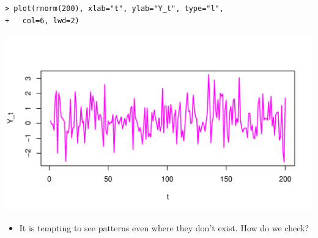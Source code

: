 \documentclass[12pt,xcolor=svgnames]{beamer}
\newcommand{\bl}{\color{blue}}
\newcommand{\nochap}{\vspace{0.5cm}}
\newcommand{\nsk}{\vspace{-.4cm}}
\begin{document}
\begin{frame}[fragile]
\nochap


{\bl \small
\begin{verbatim}
> plot(rnorm(200), xlab="t", ylab="Y_t", type="l", 
+   col=6, lwd=2)
\end{verbatim}
}

\begin{center}
\includegraphics[scale=0.6,trim=10 20 0 55]{norm_new}
\end{center}

\nsk
\begin{itemize}
\item It is tempting to see patterns even where they don't exist. {\bl How do we check?}
\end{itemize}


\end{frame}
\end{document}
